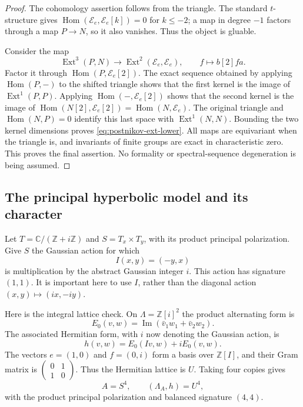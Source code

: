 \documentclass[11pt]{article}
\theoremstyle{definition}
\theoremstyle{remark}
\begin{document}
\begin{proof}
The cohomology assertion follows from the triangle.  The standard
$t$-structure gives
$\operatorname{Hom}(\mathcal E_e,\mathcal E_e[k])=0$ for $k\leq-2$;
a map in degree $-1$ factors through a map $P\to N$, so it also
vanishes.  Thus the object is gluable.

Consider the map
\[
 \operatorname{Ext}^3(P,N)\longrightarrow
 \operatorname{Ext}^2(\mathcal E_e,\mathcal E_e),
 \qquad f\longmapsto b[2]fa.
\]
Factor it through $\operatorname{Hom}(P,\mathcal E_e[2])$.
The exact sequence obtained by applying $\operatorname{Hom}(P,-)$
to the shifted triangle shows that the first kernel is the image
of $\operatorname{Ext}^1(P,P)$.  Applying
$\operatorname{Hom}(-,\mathcal E_e[2])$ shows that the second kernel
is the image of
$\operatorname{Hom}(N[2],\mathcal E_e[2])
=\operatorname{Hom}(N,\mathcal E_e)$.
The original triangle and $\operatorname{Hom}(N,P)=0$ identify
this last space with $\operatorname{Ext}^1(N,N)$.
Bounding the two kernel dimensions proves
\eqref{eq:postnikov-ext-lower}.  All maps are equivariant when the
triangle is, and invariants of finite groups are exact in
characteristic zero.  This proves the final assertion.
No formality or spectral-sequence degeneration is being assumed.
\end{proof}

\subsection{The principal hyperbolic model and its character}

Let $T=\mathbb C/(\mathbb Z+i\mathbb Z)$ and $S=T_x\times T_y$,
with its product principal polarization.  Give $S$ the Gaussian
action for which
\[
 I(x,y)=(-y,x)
\]
is multiplication by the abstract Gaussian integer $i$.
This action has signature $(1,1)$.
It is important here to use $I$, rather than the diagonal action
$(x,y)\mapsto(ix,-iy)$.

Here is the integral lattice check.  On
$\Lambda=\mathbb Z[i]^2$ the product alternating form is
\[
 E_0(v,w)=\operatorname{Im}(\bar v_1w_1+\bar v_2w_2).
\]
The associated Hermitian form, with $i$ now denoting the Gaussian
action, is
\[
 h(v,w)=E_0(Iv,w)+iE_0(v,w).
\]
The vectors $e=(1,0)$ and $f=(0,i)$ form a basis over
$\mathbb Z[I]$, and their Gram matrix is
$\left(\begin{smallmatrix}0&1\\1&0\end{smallmatrix}\right)$.
Thus the Hermitian lattice is $U$.  Taking four copies gives
\[
 A=S^4,
 \qquad (\Lambda_A,h)=U^4,
\]
with the product principal polarization and balanced signature
$(4,4)$.
\end{document}
